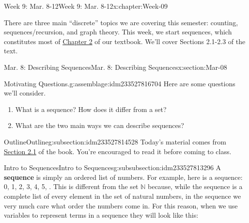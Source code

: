 \documentclass[oneside,10pt,]{book}
\newcommand{\terminology}[1]{\textbf{#1}}
\numberwithin{equation}{section}
\def\N{{\mathbb N}}
\newcommand{\N}{\mathbb N}
\begin{document}
\begin{chapterptx}{Week 9: Mar. 8-12}{}{Week 9: Mar. 8-12}{}{}{x:chapter:Week-09}
\begin{introduction}{}%
There are three main ``discrete'' topics we are covering this semester: counting, sequences\slash{}recursion, and graph theory. This week, we start sequences, which constitutes most of \href{http://discrete.openmathbooks.org/dmoi3/ch_sequences.html}{Chapter 2} of our textbook. We'll cover Sections 2.1-2.3 of the text.%
\end{introduction}%
%
%
\typeout{************************************************}
\typeout{************************************************}
%
\begin{sectionptx}{Mar. 8: Describing Sequences}{}{Mar. 8: Describing Sequences}{}{}{x:section:Mar-08}
\begin{introduction}{}%
\begin{assemblage}{Motivating Questions.}{g:assemblage:idm233527816704}%
Here are some questions we'll consider. %
\begin{enumerate}
\item{}What is a sequence? How does it differ from a set?%
\item{}What are the two main ways we can describe sequences?%
\end{enumerate}
%
\end{assemblage}
\end{introduction}%
%
%
\typeout{************************************************}
\typeout{************************************************}
%
\begin{subsectionptx}{Outline}{}{Outline}{}{}{g:subsection:idm233527814528}
Today's material comes from \href{http://discrete.openmathbooks.org/dmoi3/sec_seq_intro.html}{Section 2.1} of the book. You're encouraged to read it before coming to class.%
%
%
\typeout{************************************************}
\typeout{************************************************}
%
\begin{subsubsectionptx}{Intro to Sequences}{}{Intro to Sequences}{}{}{g:subsubsection:idm233527813296}
A \terminology{sequence}  is simply an ordered list of numbers. For example, here is a sequence: 0, 1, 2, 3, 4, 5, \textellipsis{}. This is different from the set \(\N\) because, while the sequence is a complete list of every element in the set of natural numbers, in the sequence we very much care what order the numbers come in. For this reason, when we use variables to represent terms in a sequence they will look like this:%

\end{subsubsectionptx}
\end{subsectionptx}
\end{sectionptx}
\end{chapterptx}
\end{document}
